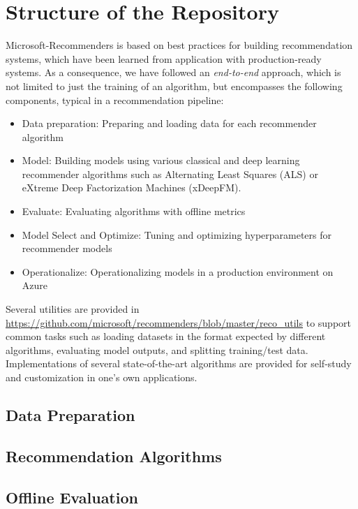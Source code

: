 \documentclass{article}
\begin{document}


\section{Structure of the Repository}

Microsoft-Recommenders is based on best practices for building recommendation systems, which have been learned from application with production-ready systems.
As a consequence, we have followed an {\em end-to-end} approach, which is not limited to just the training of an algorithm, but encompasses the following components, typical in a recommendation pipeline:

\begin{itemize}
\item Data preparation: Preparing and loading data for each recommender algorithm
\item Model: Building models using various classical and deep learning recommender algorithms such as Alternating Least Squares (ALS) or eXtreme Deep Factorization Machines (xDeepFM).
\item Evaluate: Evaluating algorithms with offline metrics
\item Model Select and Optimize: Tuning and optimizing hyperparameters for recommender models
\item Operationalize: Operationalizing models in a production environment on Azure
\end{itemize}

Several utilities are provided in \url{https://github.com/microsoft/recommenders/blob/master/reco_utils} to support common tasks such as loading datasets in the format expected by different algorithms, evaluating model outputs, and splitting training/test data. Implementations of several state-of-the-art algorithms are provided for self-study and customization in one's own applications.

\subsection{Data Preparation}



\subsection{Recommendation Algorithms}



\subsection{Offline Evaluation}
\end{document}
